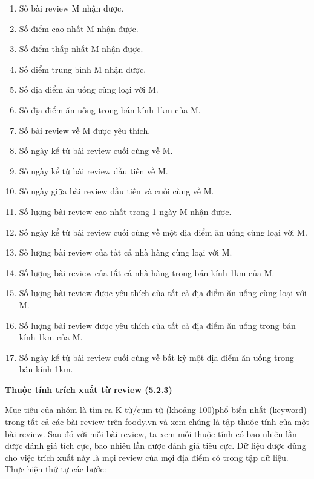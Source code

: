 \documentclass[12pt]{extarticle}
\begin{document}
				\begin{enumerate}
					\item Số bài review M nhận được.
					\item Số điểm cao nhất M nhận được.
					\item Số điểm thấp nhất M nhận được.
					\item Số điểm trung bình M nhận được.
					\item Số địa điểm ăn uống cùng loại với M.
					\item Số địa điểm ăn uống trong bán kính 1km của M.
					\item Số bài review về M được yêu thích.
					\item Số ngày kể từ bài review cuối cùng về M. 
					\item Số ngày kể từ bài review đầu tiên về M.
					\item Số ngày giữa bài review đầu tiên và cuối cùng về M. 
					\item Số lượng bài review cao nhất trong 1 ngày M nhận được.
					\item Số ngày kể từ bài review cuối cùng về một địa điểm ăn uống cùng loại với M.
					\item Số lượng bài review của tất cả nhà hàng cùng loại với M.
					\item Số lượng bài review của tất cả nhà hàng trong bán kính 1km của M.	
					\item Số lượng bài review được yêu thích của tất cả địa điểm ăn uống cùng loại với M.
					\item Số lượng bài review được yêu thích của tất cả địa điểm ăn uống trong bán kính 1km của M.
					\item Số ngày kể từ bài review cuối cùng về bất kỳ một địa điểm ăn uống trong bán kính 1km.
				\end{enumerate}
			\par \textbf{Thuộc tính trích xuất từ review (5.2.3)}
				\par Mục tiêu của nhóm là tìm ra K từ/cụm từ (khoảng 100)phổ biến nhất (keyword) trong tất cả các bài review trên foody.vn và  xem chúng là tập thuộc tính của một bài review. Sau đó với mỗi bài review, ta xem mỗi thuộc tính có bao nhiêu lần được đánh giá tích cực, bao nhiêu lần được đánh giá tiêu cực. Dữ liệu được dùng cho việc trích xuất này là mọi review của mọi địa điểm có trong tập dữ liệu. Thực hiện thứ tự các bước:
\end{document}
